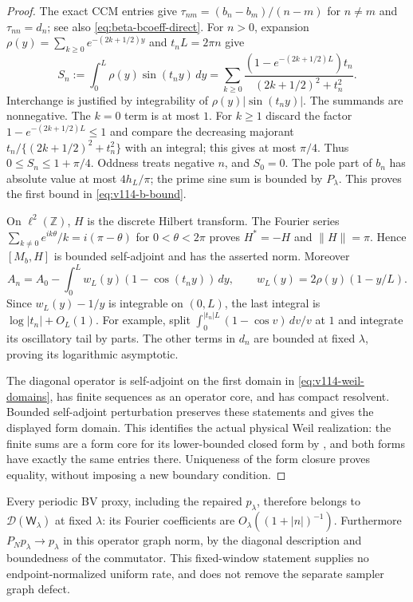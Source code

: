 \begin{proof}
The exact CCM entries give $\tau_{nm}=(b_n-b_m)/(n-m)$ for $n\ne m$
and $\tau_{nn}=d_n$; see also \eqref{eq:beta-bcoeff-direct}.
For $n>0$, expansion $\rho(y)=\sum_{k\ge0}e^{-(2k+1/2)y}$ and
$t_nL=2\pi n$ give
\[
 S_n:=\int_0^L\rho(y)\sin(t_ny)\,dy
 =\sum_{k\ge0}\frac{(1-e^{-(2k+1/2)L})t_n}
                         {(2k+1/2)^2+t_n^2}.
\]
Interchange is justified by integrability of
$\rho(y)|\sin(t_ny)|$. The summands are nonnegative. The $k=0$
term is at most $1$. For $k\ge1$ discard the factor
$1-e^{-(2k+1/2)L}\le1$ and compare the decreasing majorant
$t_n/\{(2k+1/2)^2+t_n^2\}$ with an integral; this gives at most
$\pi/4$. Thus
$0\le S_n\le1+\pi/4$. Oddness treats negative $n$, and $S_0=0$.
The pole part of $b_n$ has absolute value at most $4h_L/\pi$;
the prime sine sum is bounded by $P_\lambda$. This proves the first
bound in \eqref{eq:v114-b-bound}.

On $\ell^2(\mathbb Z)$, $H$ is the discrete Hilbert transform.
The Fourier series $\sum_{k\ne0}e^{ik\theta}/k=i(\pi-\theta)$
for $0<\theta<2\pi$ proves $H^*=-H$ and $\|H\|=\pi$.
Hence $[M_b,H]$ is bounded self-adjoint and has the asserted norm.
Moreover
\[
 A_n=A_0-\int_0^L w_L(y)(1-\cos(t_ny))\,dy,
 \qquad w_L(y)=2\rho(y)(1-y/L).
\]
Since $w_L(y)-1/y$ is integrable on $(0,L)$, the last integral is
$\log|t_n|+O_L(1)$. For example, split
$\int_0^{|t_n|L}(1-\cos v)\,dv/v$ at $1$ and integrate its
oscillatory tail by parts. The other terms in $d_n$ are bounded at
fixed $\lambda$, proving its logarithmic asymptotic.

The diagonal operator is self-adjoint on the first domain in
\eqref{eq:v114-weil-domains}, has finite sequences as an operator
core, and has compact resolvent. Bounded self-adjoint perturbation
preserves these statements and gives the displayed form domain.
This identifies the actual physical Weil realization: the finite sums
are a form core for its lower-bounded closed form by
\cite[Propositions~3.2--3.4]{ConnesConsaniMoscovici2025}, and both
forms have exactly the same entries there. Uniqueness of the form
closure proves equality, without imposing a new boundary condition.
\end{proof}

Every periodic BV proxy, including the repaired $p_\lambda$, therefore
belongs to $\mathcal D(\mathsf W_\lambda)$ at fixed $\lambda$:
its Fourier coefficients are $O_\lambda((1+|n|)^{-1})$.
Furthermore $P_Np_\lambda\to p_\lambda$ in this operator graph norm,
by the diagonal description and boundedness of the commutator. This
fixed-window statement supplies no endpoint-normalized uniform rate,
and does not remove the separate sampler graph defect.

